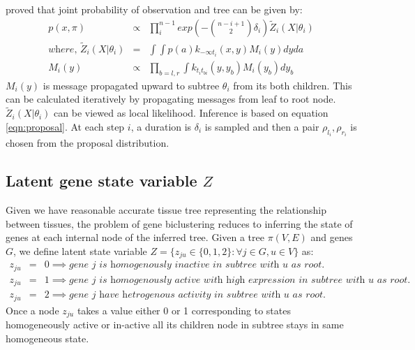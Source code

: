 \documentclass{article}
\begin{document}
\cite{teh2008bayesian} proved that joint probability of observation and tree can be given by:
\begin{eqnarray}
	p(x, \pi) &\propto& \prod_{i}^{n-1}exp\left( -\binom{n-i +1}{2}\delta_i \right) \tilde{Z}_{i}(X|\theta_i) \\ 
	\textit{where, } \tilde{Z}_{i}(X|\theta_i) & =& \int \int p(a) k_{- \infty t_{i}} (x,y) M_{i}(y) dy da \\ 
	M_i(y) &\propto& \prod_{b=l,r} \int k_{t_i t_{bi}}(y,y_b) M_i(y_b) dy_b 
	\label{eqn:proposal}
\end{eqnarray}
$M_i(y)$ is message propagated upward to subtree $\theta_i$ from its both children. This can be calculated iteratively
by propagating messages from leaf to root node. $\tilde{Z}_{i}(X|\theta_i)$ can be viewed as local likelihood. Inference
is based on equation \ref{eqn:proposal}. At each step $i$, a duration is $\delta_i$ is sampled and then a pair $\rho_{l_i},\rho_{r_i}$
is chosen from the proposal distribution.


\subsection{Latent gene state variable $Z$}
Given we have reasonable accurate tissue tree representing the relationship between tissues,
the problem of gene biclustering reduces to inferring the 
state of genes at each internal node of the inferred tree. 
Given a tree $\pi(V,E)$ and genes $G$, we define latent state variable $Z= \{z_{ju} \in\{0,1,2\} : \forall j \in G, u \in V\}$ as:
\begin{eqnarray}
	z_{ju} &=& 0 \implies \textit{gene $j$ is homogenously inactive in subtree with $u$ as root.} \nonumber\\ 
	z_{ju} &=& 1 \implies \textit{gene $j$ is homogenously active with high expression in subtree with  $u$ as root.} \nonumber \\
	z_{ju} &=& 2 \implies \textit{gene $j$ have hetrogenous activity in subtree with $u$ as root.} \nonumber 
\end{eqnarray}
Once a node $z_{ju}$ takes a value either 0 or 1 corresponding to states  
homogeneously active or in-active all its children node in subtree stays in same homogeneous state.
\end{document}
